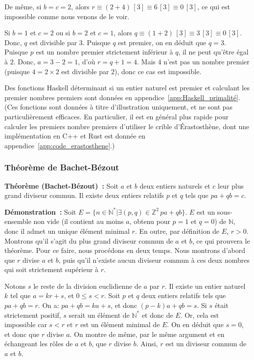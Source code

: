 De même, si $b = c = 2$, alors $r \equiv (2 + 4) \, [3] \equiv 6 \, [3] \equiv 0 \, [3]$, ce qui est impossible comme nous venons de le voir.

Si $b = 1$ et $c = 2$ ou si $b = 2$ et $c = 1$, alors $q \equiv (1 + 2) \, [3] \equiv 3 \, [3] \equiv 0 \, [3]$. 
Donc, $q$ est divisible par $3$.
Puisque $q$ est premier, on en déduit que $q=3$. 
Puisque $p$ est un nombre premier strictement inférieur à $q$, il ne peut qu'être égal à $2$. 
Donc, $a = 3-2 = 1$, d'où $r = q + 1 = 4$. 
Mais $4$ n'est pas un nombre premier (puisque $4 = 2 \times 2$ est divisible par $2$), donc ce cas est impossible.

\done

\bigskip

Des fonctions Haskell déterminant si un entier naturel est premier et calculant les premier nombres premiers sont données en appendice~\ref{app:Haskell_primalité}. 
(Ces fonctions sont données à titre d'illustration uniquement, et ne sont pas particulièrement efficaces. 
En particulier, il est en général plus rapide pour calculer les premiers nombre premiers d'utiliser le crible d'Érastosthène, dont une implémentation en C++ et Rust est donnée en appendice~\ref{app:code_erastosthene}.)

\subsubsection{Théorème de Bachet-Bézout}

\bigskip

\noindent\textbf{Théorème (Bachet-Bézout) :} 
Soit $a$ et $b$ deux entiers naturels et $c$ leur plus grand diviseur commun. 
Il existe deux entiers relatifs $p$ et $q$ tels que $p a + q b = c$. 

\medskip

\noindent\textbf{Démonstration :} 
Soit $E = \lbrace n \in \mathbb{N}^* \vert \exists (p,q) \in \mathbb{Z}^2 \, p a + q b \rbrace$. 
$E$ est un sous-ensemble non vide (il contient au moins $a$, obtenu pour $p=1$ et $q=0$) de $\mathbb{N}$, donc il admet un unique élément minimal $r$. 
En outre, par définition de $E$, $r > 0$. 
Montrons qu'il s'agit du plus grand diviseur commun de $a$ et $b$, ce qui prouvera le théorème. 
Pour ce faire, nous procédons en deux temps. 
Nous montrons d'abord que $r$ divise $a$ et $b$, puis qu'il n'existe aucun diviseur commun à ces deux nombres qui soit strictement supérieur à $r$.

Notons $s$ le reste de la division euclidienne de $a$ par $r$. 
Il existe un entier naturel $k$ tel que $a = k r + s$, et $0 \leq s < r$. 
Soit $p$ et $q$ deux entiers relatifs tels que $p a + q b = r$. 
On a: $p a + q b = k a + s$, et donc $(p-k) a + q b = s$. 
Si $s$ était strictement positif, $s$ serait un élément de $\mathbb{N}^*$ et donc de $E$. 
Or, cela est impossible car $s < r$ et $r$ est un élément minimal de $E$. 
On en déduit que $s = 0$, et donc que $r$ divise $a$. 
On montre de même, par le même argument et en échangeant les rôles de $a$ et $b$, que $r$ divise $b$. 
Ainsi, $r$ est un diviseur commun de $a$ et $b$. 

